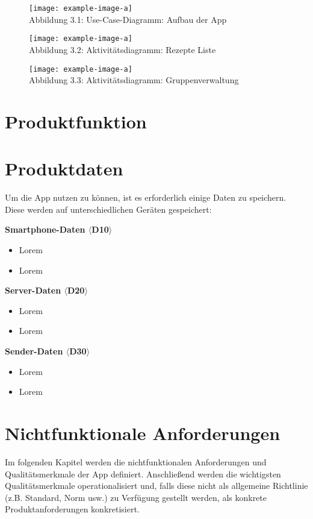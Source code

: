 \documentclass[parskip=full]{scrartcl}
\begin{document}
\begin{figure}[htp]
    \centering
    \texttt{[image: example-image-a]}\\
    Abbildung 3.1: Use-Case-Diagramm: Aufbau der App
    \label{fig:A31}
\end{figure}
\newpage

\begin{figure}[htp]
    \centering
    \texttt{[image: example-image-a]}\\
    Abbildung 3.2: Aktivitätsdiagramm: Rezepte Liste
    \label{fig:A32}
\end{figure}
\newpage

\begin{figure}[htp]
    \centering
    \texttt{[image: example-image-a]}\\
    Abbildung 3.3: Aktivitätsdiagramm: Gruppenverwaltung
    \label{fig:A33}
\end{figure}
\newpage

\section{Produktfunktion}

\section{Produktdaten}
Um die App nutzen zu können, ist es erforderlich einige Daten zu speichern. Diese werden auf unterschiedlichen Geräten gespeichert:

\textbf{Smartphone-Daten $\langle$D10$\rangle$}
\begin{itemize}
    \item Lorem
    \item Lorem
\end{itemize}

\textbf{Server-Daten $\langle$D20$\rangle$}
\begin{itemize}
    \item Lorem
    \item Lorem
\end{itemize}

\textbf{Sender-Daten $\langle$D30$\rangle$}
\begin{itemize}
    \item Lorem
    \item Lorem
\end{itemize}

\section{Nichtfunktionale Anforderungen}
Im folgenden Kapitel werden die nichtfunktionalen Anforderungen und Qualitätsmerkmale der App definiert.
Anschließend werden die wichtigsten Qualitätsmerkmale operationalisiert und, falls diese nicht als allgemeine Richtlinie (z.B. Standard, Norm usw.) zu Verfügung gestellt werden, 
als konkrete Produktanforderungen konkretisiert.
\end{document}
